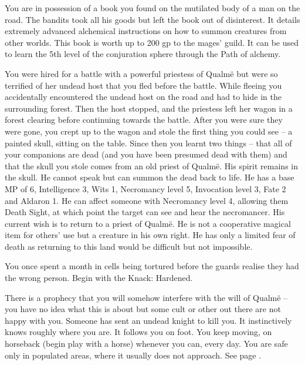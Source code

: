 \begin{list}{\addtocounter{list}{1}\textbf{:}}{\raggedleft}
\item{You are in possession of a book you found on the mutilated body of a man on the road.  The bandits took all his goods but left the book out of disinterest.  It details extremely advanced alchemical instructions on how to summon creatures from other worlds.  This book is worth up to 200 gp to the mages' guild.  It can be used to learn the 5th level of the conjuration sphere through the Path of alchemy.}

\item{You were hired for a battle with a powerful priestess of Qualm\"{e} but were so terrified of her undead host that you fled before the battle.  While fleeing you accidentally encountered the undead host on the road and had to hide in the surrounding forest.  Then the host stopped, and the priestess left her wagon in a forest clearing before continuing towards the battle. After you were sure they were gone, you crept up to the wagon and stole the first thing you could see -- a painted skull, sitting on the table.  Since then you learnt two things -- that all of your companions are dead (and you have been presumed dead with them) and that the skull you stole comes from an old priest of Qualm\"{e}.  His spirit remains in the skull.  He cannot speak but can summon the dead back to life.  He has a base MP of 6, Intelligence 3, Wits 1, Necromancy level 5, Invocation level 3, Fate 2 and Aldaron 1.  He can affect someone with Necromancy level 4, allowing them Death Sight, at which point the target can see and hear the necromancer.  His current wish is to return to a priest of Qualm\"{e}.  He is not a cooperative magical item for others' use but a creature in his own right.  He has only a limited fear of death as returning to this land would be difficult but not impossible.}

\item{You once spent a month in cells being tortured before the guards realise they had the wrong person.  Begin with the Knack: Hardened.}

\item{There is a prophecy that you will somehow interfere with the will of Qualm\"{e} -- you have no idea what this is about but some cult or other out there are not happy with you.  Someone has sent an undead knight to kill you.  It instinctively knows roughly where you are.  It follows you on foot. You keep moving, on horseback (begin play with a horse) whenever you can, every day.  You are safe only in populated areas, where it usually does not approach.  See page \pageref{ghast}.}


\end{list}
